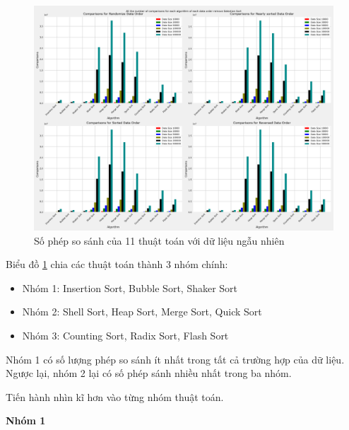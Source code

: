\begin{figure}[H]
    \centering
    \includegraphics[width=\textwidth]{experimental_result/images/all_the_number_of_comparisons_for_each_algorithm_of_each_data_order_remove_selection_sort.png}
    \caption{Số phép so sánh của 11 thuật toán với dữ liệu ngẫu nhiên}
    \label{fig:all_the_number_of_comparisons_for_each_algorithm_of_each_data_order_remove_selection_sort}
\end{figure}


Biểu đồ \ref{fig:all_the_number_of_comparisons_for_each_algorithm_of_each_data_order_remove_selection_sort} chia các thuật toán thành 3 nhóm chính: 
\begin{itemize}
    \item Nhóm 1: Insertion Sort, Bubble Sort, Shaker Sort 
    \item Nhóm 2: Shell Sort, Heap Sort, Merge Sort, Quick Sort
    \item Nhóm 3: Counting Sort, Radix Sort, Flash Sort
\end{itemize}

Nhóm 1 có số lượng phép so sánh ít nhất trong tất cả trường hợp của dữ liệu. Ngược lại, nhóm 2 lại có số phép sánh nhiều nhất trong ba nhóm.

Tiến hành nhìn kĩ hơn vào từng nhóm thuật toán.

\textbf{Nhóm 1}

